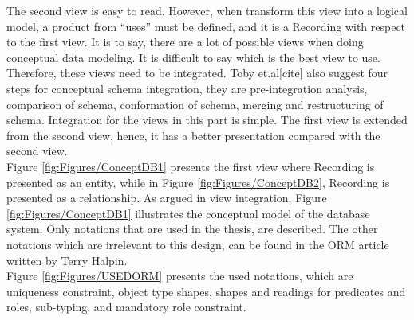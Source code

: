 The second view is easy to read. However, when transform this view into a logical model, a product from “uses” must be defined, and it is a Recording with respect to the first view. It is to say, there are a lot of possible views when doing conceptual data modeling. It is difficult to say which is the best view to use. Therefore, these views need to be integrated. Toby et.al[cite] also suggest four steps for conceptual schema integration, they are pre-integration analysis, comparison of schema, conformation of schema, merging and restructuring of schema. Integration for the views in this part is simple. The first view is extended from the second view, hence, it has a better presentation compared with the second view.\\
Figure \ref{fig:Figures/ConceptDB1} presents the first view where Recording is presented as an entity, while in Figure \ref{fig:Figures/ConceptDB2}, Recording is presented as a relationship. As argued in view integration, Figure \ref{fig:Figures/ConceptDB1} illustrates the conceptual model of the database system. Only notations that are used in the thesis, are described. The other notations which are irrelevant to this design, can be found in the ORM article written by Terry Halpin\cite{ORMdotNET2}.\\
Figure \ref{fig:Figures/USEDORM} presents the used notations, which are uniqueness constraint, object type shapes, shapes and readings for predicates and roles, sub-typing, and mandatory role constraint.\\
